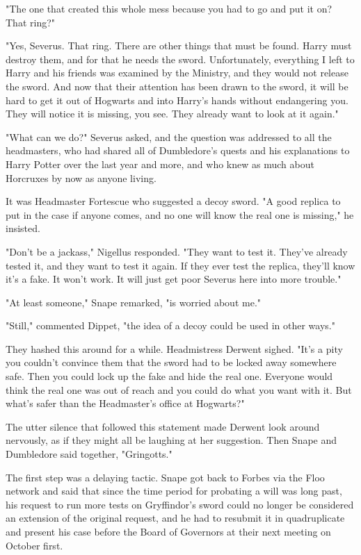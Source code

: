 "The one that created this whole mess because you had to go and put it on? That ring?"

"Yes, Severus. That ring. There are other things that must be found. Harry must destroy them, and for that he needs the sword. Unfortunately, everything I left to Harry and his friends was examined by the Ministry, and they would not release the sword. And now that their attention has been drawn to the sword, it will be hard to get it out of Hogwarts and into Harry's hands without endangering you. They will notice it is missing, you see. They already want to look at it again."

"What can we do?" Severus asked, and the question was addressed to all the headmasters, who had shared all of Dumbledore's quests and his explanations to Harry Potter over the last year and more, and who knew as much about Horcruxes by now as anyone living.

It was Headmaster Fortescue who suggested a decoy sword. "A good replica to put in the case if anyone comes, and no one will know the real one is missing," he insisted.

"Don't be a jackass," Nigellus responded. "They want to test it. They've already tested it, and they want to test it again. If they ever test the replica, they'll know it's a fake. It won't work. It will just get poor Severus here into more trouble."

"At least someone," Snape remarked, "is worried about me."

"Still," commented Dippet, "the idea of a decoy could be used in other ways."

They hashed this around for a while. Headmistress Derwent sighed. "It's a pity you couldn't convince them that the sword had to be locked away somewhere safe. Then you could lock up the fake and hide the real one. Everyone would think the real one was out of reach and you could do what you want with it. But what's safer than the Headmaster's office at Hogwarts?"

The utter silence that followed this statement made Derwent look around nervously, as if they might all be laughing at her suggestion. Then Snape and Dumbledore said together, "Gringotts."

The first step was a delaying tactic. Snape got back to Forbes via the Floo network and said that since the time period for probating a will was long past, his request to run more tests on Gryffindor's sword could no longer be considered an extension of the original request, and he had to resubmit it in quadruplicate and present his case before the Board of Governors at their next meeting on October first.

